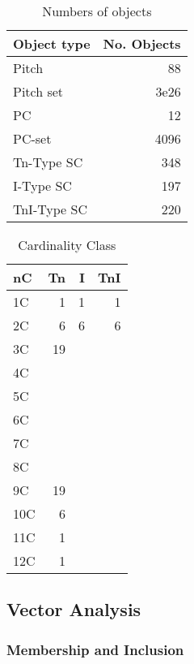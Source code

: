 \documentclass{article}
\begin{document}
\begin{table}[htb]
\caption{Numbers of objects} 
\begin{center}
\begin{tabular}{lr}
 Object type  &  No. Objects  \\
\hline
 Pitch        &           88  \\
 Pitch set    &         3e26  \\
 PC           &           12  \\
 PC-set       &         4096  \\
 Tn-Type SC   &          348  \\
 I-Type SC    &          197  \\
 TnI-Type SC  &          220  \\
\end{tabular}
\end{center}
\end{table}


\begin{table}[htb]
\caption{Cardinality Class} 
\begin{center}
\begin{tabular}{lrrr}
 nC   &  Tn  &  I  &  TnI  \\
\hline
 1C   &   1  &  1  &    1  \\
 2C   &   6  &  6  &    6  \\
 3C   &  19  &     &       \\
 4C   &      &     &       \\
 5C   &      &     &       \\
 6C   &      &     &       \\
 7C   &      &     &       \\
 8C   &      &     &       \\
 9C   &  19  &     &       \\
 10C  &   6  &     &       \\
 11C  &   1  &     &       \\
 12C  &   1  &     &       \\
\end{tabular}
\end{center}
\end{table}
\subsection{Vector Analysis}
\label{sec-3-3}
\subsubsection{Membership and Inclusion}
\label{sec-3-3-1}
\end{document}
